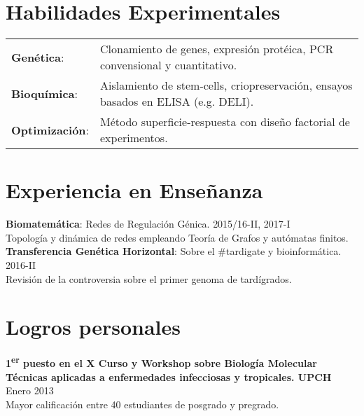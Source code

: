 \documentclass[margin,line]{res}
\begin{document}
\begin{resume}
\section{\sc Habilidades Experimentales}
\begin{tabular}{ l l }
	{\bf Genética}: & Clonamiento de genes, expresión protéica, PCR convensional y cuantitativo.\\
	{\bf Bioquímica}: & Aislamiento de stem-cells, criopreservación, ensayos basados en ELISA (e.g. DELI).\\ 
	{\bf Optimización}: & Método superficie-respuesta con diseño factorial de experimentos.\\
\end{tabular}

		
\section{\sc Experiencia en Enseñanza}
	{\bf Biomatemática}: Redes de Regulación Génica. \hfill {2015/16-II, 2017-I}\\ Topología y dinámica de redes empleando Teoría de Grafos y autómatas finitos. \\[4pt] 
	{\bf Transferencia Genética Horizontal}: Sobre el \#tardigate y bioinformática. \hfill {2016-II}\\ Revisión de la controversia sobre el primer genoma de tardígrados.\\
		
		
\newpage
		
		\section{\sc Logros personales}
		
		{\bf 1\textsuperscript{er} puesto en el X Curso y Workshop sobre Biología Molecular \\Técnicas aplicadas a enfermedades infecciosas y tropicales. UPCH} \hfill Enero 2013\\
		Mayor calificación entre 40 estudiantes de posgrado y pregrado.
		

\end{resume}
\end{document}
